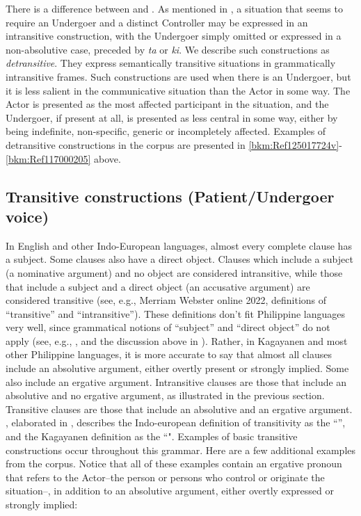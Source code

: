 There is a difference between  and . As mentioned in , a situation that seems to require an Undergoer and a distinct Controller may be expressed in an intransitive construction, with the Undergoer simply omitted or expressed in a non-absolutive case, preceded by \textit{ta} or \textit{ki}. We describe such constructions as \textit{detransitive}. They express semantically transitive situations in grammatically intransitive frames. Such constructions are used when there is an Undergoer, but it is less salient in the communicative situation than the Actor in some way. The Actor is presented as the most affected participant in the situation, and the Undergoer, if present at all, is presented as less central in some way, either by being indefinite, non-specific, generic or incompletely affected. Examples of detransitive constructions in the corpus are presented in \ref{bkm:Ref125017724v}-\ref{bkm:Ref117000205} above.
\subsection{Transitive constructions (Patient/Undergoer voice)}
In English and other Indo-European languages, almost every complete clause has a subject. Some clauses also have a direct object. Clauses which include a subject (a nominative argument) and no object are considered intransitive, while those that include a subject and a direct object (an accusative argument) are considered transitive (see, e.g., Merriam Webster online 2022, definitions of “transitive” and “intransitive”). These definitions don’t fit Philippine languages very well, since grammatical notions of “subject” and “direct object” do not apply (see, e.g., \citealt{cena1977, nolasco2018}, and the discussion above in ). Rather, in Kagayanen and most other Philippine languages, it is more accurate to say that almost all clauses include an absolutive argument, either overtly present or strongly implied. Some also include an ergative argument. Intransitive clauses are those that include an absolutive and no ergative argument, as illustrated in the previous section. Transitive clauses are those that include an absolutive and an ergative argument. \citet{halliday2004}, elaborated in \citet[478--484]{lapolla2011}, describes the Indo-european definition of transitivity as the “”, and the Kagayanen definition as the “". Examples of basic transitive constructions occur throughout this grammar. Here are a few additional examples from the corpus. Notice that all of these examples contain an ergative pronoun that refers to the Actor--the person or persons who control or originate the situation--, in addition to an absolutive argument, either overtly expressed or strongly implied:


